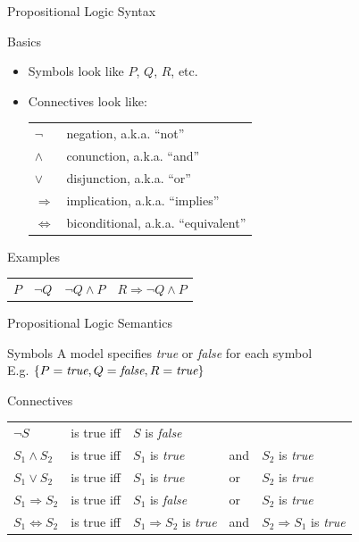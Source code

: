 \documentclass[14pt]{beamer}
\newcommand{\limpl}{\Rightarrow}
\newcommand{\liff}{\Leftrightarrow}
\begin{document}
\begin{frame}{Propositional Logic Syntax}
\begin{block}{Basics}
\begin{itemize}
\item Symbols look like $P$, $Q$, $R$, etc.
\item Connectives look like:\\[0.5em]
\begin{tabular}{ll}
$\lnot$  & negation, a.k.a. ``not'' \\
$\land$  & conunction, a.k.a. ``and'' \\
$\lor$   & disjunction, a.k.a. ``or'' \\
$\limpl$ & implication, a.k.a. ``implies'' \\
$\liff$  & biconditional, a.k.a. ``equivalent''
\end{tabular}
\end{itemize}
\end{block}
\pause
\begin{block}{Examples}
\setlength{\tabcolsep}{1.5em}
\begin{tabular}{ l l l l }
$P$ &
$\lnot Q$ &
$\lnot Q \land P$ &
$R \limpl \lnot Q \land P$
\end{tabular}
\end{block}
\end{frame}

\begin{frame}{Propositional Logic Semantics}
	\begin{block}{Symbols}
		A model specifies \emph{true} or \emph{false} for each symbol \\
		\hspace{1em} E.g. $\{P=\mbox{\em true}, Q=\mbox{\em false}, R=\mbox{\em true}\}$
	\end{block}
	\pause
	\begin{block}{Connectives}
		\small
		\begin{tabular}{@{}lllll}
			$\lnot S$         & is true iff & $S$ is \emph{false} \\
			$S_1 \land S_2$   & is true iff & $S_1$ is \emph{true}            & and & $S_2$ is \emph{true} \\
			$S_1 \lor S_2$    & is true iff & $S_1$ is \emph{true}            & or  & $S_2$ is \emph{true} \\
			$S_1 \limpl S_2$  & is true iff & $S_1$ is \emph{false}           & or  & $S_2$ is \emph{true} \\
			$S_1 \liff S_2$   & is true iff & $S_1 \limpl S_2$ is \emph{true} & and & $S_2 \limpl S_1$ is \emph{true}
		\end{tabular}
	\end{block}
\end{frame}
\end{document}

